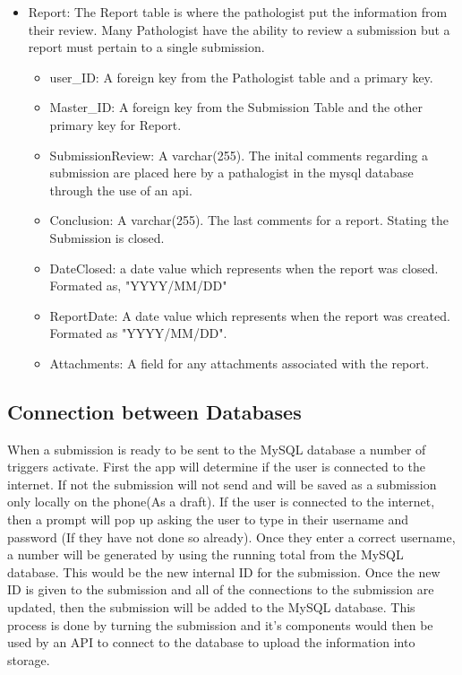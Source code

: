 \documentclass[onecolumn, draftclsnofoot, article, 10pt, compsoc]{IEEEtran}
\begin{document}
\begin{itemize}
\item Report:\newline
The Report table is where the pathologist put the information from their review. Many Pathologist have the ability to review a submission but a report must pertain to a single submission.
\begin{itemize}
\item user\_ID: A foreign key from the Pathologist table and a primary key.
\item Master\_ID: A foreign key from the Submission Table and the other primary key for Report.
\item SubmissionReview: A varchar(255). The inital comments regarding a submission are placed here by a pathalogist in the mysql database through the use of an api.
\item Conclusion: A varchar(255). The last comments for a report. Stating the Submission is closed.
\item DateClosed: a date value which represents when the report was closed. Formated as, "YYYY/MM/DD"
\item ReportDate: A date value which represents when the report was created. Formated as "YYYY/MM/DD".
\item Attachments: A field for any attachments associated with the report.
\end{itemize}

\end{itemize}

\subsection{Connection between Databases}
When a submission is ready to be sent to the MySQL database a number of triggers activate. First the app will determine if the user is connected to the internet. If not the submission will not send and will be saved as a submission only locally on the phone(As a draft). If the user is connected to the internet, then a prompt will pop up asking the user to type in their username and password (If they have not done so already). Once they enter a correct username, a number will be generated by using the running total from the MySQL database. This would be the new internal ID for the submission. Once the new ID is given to the submission and all of the connections to the submission are updated, then the submission will be added to the MySQL database. This process is done by turning the submission and it's components would then be used by an API to connect to the database to upload the information into storage.
\end{document}
